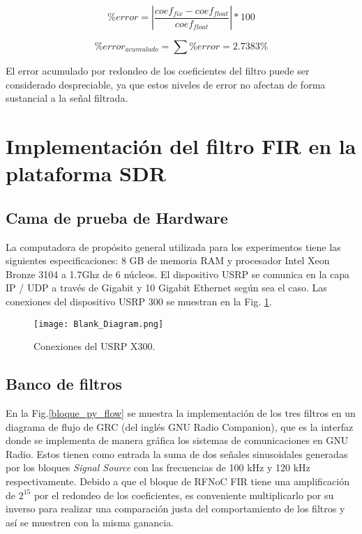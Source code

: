 \documentclass[12pt]{difu100cia} %
\begin{document}
\begin{equation}
        \% error = | \frac{coef_{fix}-coef_{float}}{coef_{float}}|*100 
        \label{ec_error}  
\end{equation}

\begin{equation}
    \% error_{acumulado}=\sum{\%error}=2.7383\%
    \label{ec_error2}  
\end{equation}

El error acumulado por redondeo de los coeficientes del filtro puede ser considerado despreciable, ya que estos niveles de error no afectan de forma sustancial a la señal filtrada.


\section{Implementación del filtro FIR en la plataforma SDR}
\label{implementacion}

\subsection{Cama de prueba de Hardware}

La computadora de propósito general utilizada para los experimentos tiene las siguientes especificaciones: 8 GB de memoria RAM y procesador Intel Xeon Bronze 3104 a 1.7Ghz de 6 núcleos. El dispositivo USRP se comunica en la capa IP / UDP a través de Gigabit y 10 Gigabit Ethernet según sea el caso. Las conexiones del dispositivo USRP 300 se muestran en la Fig. \ref{bloque_connexiones}.  

\begin{figure}[!htb]
	\centering
	\texttt{[image: Blank\_Diagram.png]}
	\caption{Conexiones del USRP X300.}
	\label{bloque_connexiones}
\end{figure}

\subsection{Banco de filtros}

En la Fig.\ref{bloque_py_flow} se muestra la implementación de los tres filtros en un diagrama de flujo de GRC (del inglés GNU Radio Companion), que es la interfaz donde se implementa de manera gráfica los sistemas de comunicaciones en GNU Radio. Estos tienen como entrada la suma de dos señales sinusoidales generadas por los bloques \textit{Signal Source} con las frecuencias de 100 kHz y 120 kHz respectivamente. Debido a que el bloque de RFNoC FIR tiene una amplificación de $2^{15}$ por el redondeo de los coeficientes, es conveniente multiplicarlo por su inverso para realizar una comparación justa del comportamiento de los filtros y así se muestren con la misma ganancia.        
\end{document}
